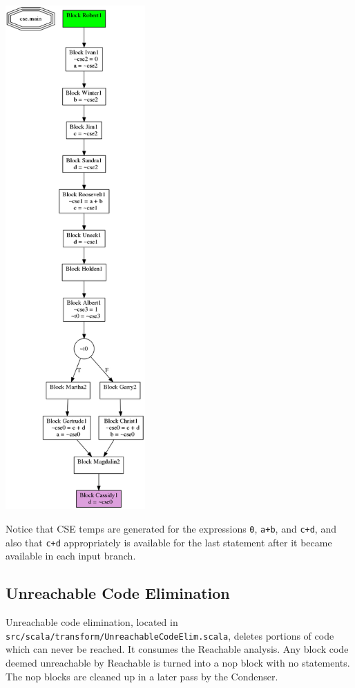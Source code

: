 \documentclass[11pt]{article}
\begin{document}
  \includegraphics[width=0.4\textwidth]{./after_cse.png}

  Notice that CSE temps are generated for the expressions \texttt{0}, \texttt{a+b}, and \texttt{c+d}, and also that \texttt{c+d}
  appropriately is available for the last statement after it became available in each input branch. 

\subsection{Unreachable Code Elimination}
\label{sec-3.2}

    Unreachable code elimination, located in \texttt{src/scala/transform/UnreachableCodeElim.scala}, 
    deletes portions of code which can never be reached. It consumes the Reachable analysis. Any 
    block code deemed unreachable by Reachable is turned into a nop block with no statements. The 
    nop blocks are cleaned up in a later pass by the Condenser.
\end{document}
